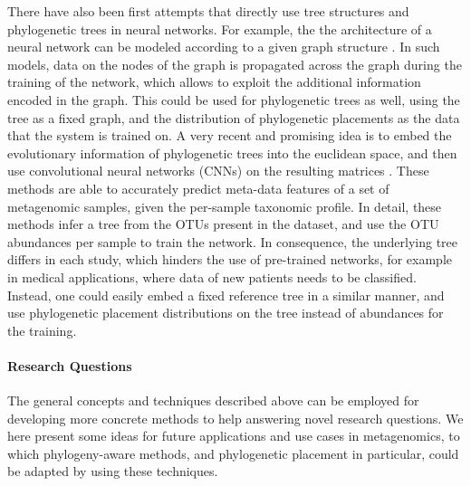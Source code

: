There have also been first attempts that directly use tree structures and phylogenetic trees in neural networks.
For example, the the architecture of a neural network can be modeled
according to a given graph structure \cite{Scarselli2009,Bronstein2017}.
In such models, data on the nodes of the graph is propagated across the graph during the training of the network,
which allows to exploit the additional information encoded in the graph.
This could be used for phylogenetic trees as well, using the tree as a fixed graph,
and the distribution of phylogenetic placements as the data that the system is trained on.
A very recent and promising idea is to embed the evolutionary information of phylogenetic trees into the euclidean space,
and then use convolutional neural networks (CNNs) on the resulting matrices \cite{Fioravanti2018,Reiman2017,Reiman2018}.
These methods are able to accurately predict meta-data features of a set of metagenomic samples,
given the per-sample taxonomic profile.
In detail, these methods infer a tree from the OTUs present in the dataset,
and use the OTU abundances per sample to train the network.
In consequence, the underlying tree differs in each study, which hinders the use of pre-trained networks,
for example in medical applications, where data of new patients needs to be classified.
Instead, one could easily embed a fixed reference tree in a similar manner,
and use phylogenetic placement distributions on the tree instead of abundances for the training.

\paragraph{Research Questions}
\label{ch:ConclusionOutlook:par:ResearchQuestions}


The general concepts and techniques described above %
can be employed for developing more concrete methods to help answering novel research questions.
We here present some ideas for future applications and use cases in metagenomics,
to which phylogeny-aware methods, and phylogenetic placement in particular, could be adapted
by using these techniques.

